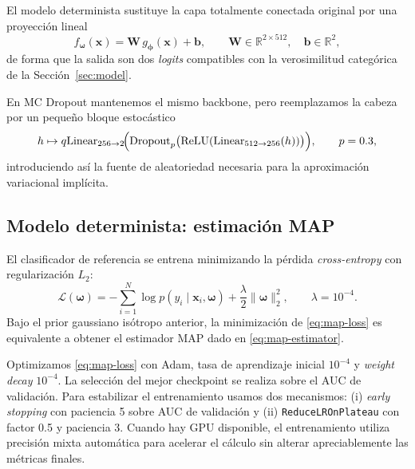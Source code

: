 \documentclass{article}
\begin{document}
El modelo determinista sustituye la capa totalmente conectada original
por una proyecci\'on lineal
\begin{equation}
f_{\boldsymbol{\omega}}(\mathbf{x})
=
\mathbf{W}\,g_{\boldsymbol{\phi}}(\mathbf{x})+\mathbf{b},
\qquad
\mathbf{W}\in\mathbb{R}^{2\times 512},
\quad
\mathbf{b}\in\mathbb{R}^{2},
\label{eq:det-head}
\end{equation}
de forma que la salida son dos \emph{logits} compatibles con la
verosimilitud categ\'orica de la Secci\'on~\ref{sec:model}.

En MC Dropout mantenemos el mismo backbone, pero reemplazamos la cabeza
por un peque\~no bloque estoc\'astico
\begin{equation}
h \mapsto q
\mathrm{Linear}_{256\rightarrow 2}
\!\Bigl(
\mathrm{Dropout}_{p}
\bigl(
\mathrm{ReLU}(
\mathrm{Linear}_{512\rightarrow 256}(h))
\bigr)
\Bigr),
\qquad p=0.3,
\label{eq:mc-head}
\end{equation}
introduciendo as\'i la fuente de aleatoriedad necesaria para la
aproximaci\'on variacional impl\'icita.

\subsection{Modelo determinista: estimaci\'on MAP}
\label{sec:map-model}

El clasificador de referencia se entrena minimizando la p\'erdida %
\emph{cross-entropy} con regularizaci\'on \(L_2\):
\begin{equation}
\mathcal{L}(\boldsymbol{\omega})
=
-\sum_{i=1}^{N}
\log p(y_i\mid \mathbf{x}_i,\boldsymbol{\omega})
+
\frac{\lambda}{2}\lVert \boldsymbol{\omega}\rVert_2^2,
\qquad
\lambda = 10^{-4}.
\label{eq:map-loss}
\end{equation}
Bajo el prior gaussiano is\'otropo anterior, la minimizaci\'on de
\eqref{eq:map-loss} es equivalente a obtener el estimador MAP dado en
\eqref{eq:map-estimator}.

Optimizamos \eqref{eq:map-loss} con Adam, tasa de aprendizaje inicial
\(10^{-4}\) y \emph{weight decay} \(10^{-4}\). La selecci\'on del mejor
checkpoint se realiza sobre el AUC de validaci\'on. Para estabilizar el
entrenamiento usamos dos mecanismos: (i) \emph{early stopping} con
paciencia 5 sobre AUC de validaci\'on y (ii)
\texttt{ReduceLROnPlateau} con factor 0.5 y paciencia 3. Cuando hay GPU
disponible, el entrenamiento utiliza precisi\'on mixta autom\'atica para
acelerar el c\'alculo sin alterar apreciablemente las m\'etricas
finales.
\end{document}
